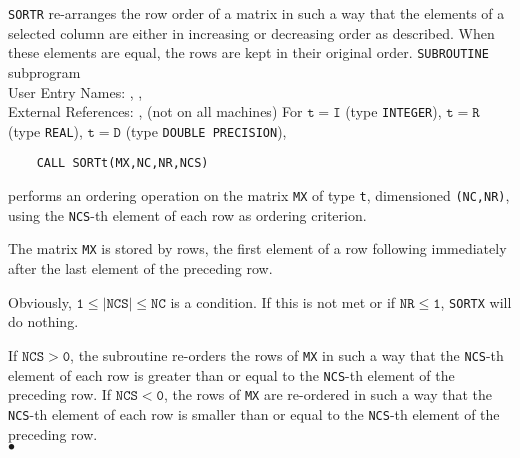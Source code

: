                                         
                                 
\Submitter{}                                     
{\tt SORTR} re-arranges the row order of a matrix in such a way that the
elements of a selected column are either in increasing or decreasing
order as described. When these elements are equal, the rows are kept
in their original order.
\Structure
{\tt SUBROUTINE} subprogram \\
User Entry Names: , , \\
External References: , 
(not on all machines)
\Usage
For $\mathtt{t=I}$ (type {\tt INTEGER}),
$\mathtt{t=R}$ (type {\tt REAL}), $\mathtt{t=D}$ (type
{\tt DOUBLE PRECISION}),
\begin{verbatim}
    CALL SORTt(MX,NC,NR,NCS)
\end{verbatim}
performs an ordering operation on the matrix {\tt MX} of type {\tt t},
dimensioned {\tt (NC,NR)}, using the {\tt NCS}-th element of each
row as ordering criterion.
\par
The matrix {\tt MX} is stored by rows, the first element of a row
following immediately after the last element of the preceding row.
\par
Obviously, $\mathtt{1 \le |NCS| \le NC}$ is a condition. If this is not
met or if $\mathtt{NR \le 1}$, {\tt SORTX} will do nothing.
\par
If $\mathtt{NCS > 0}$, the subroutine re-orders the rows of
{\tt MX} in such
a way that the {\tt NCS}-th element of each row is greater than or
equal to the {\tt NCS}-th element of the preceding row. If
$\mathtt{NCS < 0}$, the rows of {\tt MX} are re-ordered in such a way that
the {\tt NCS}-th element of each row is smaller than or equal to the
{\tt NCS}-th element of the preceding row.
\\ $\bullet$
